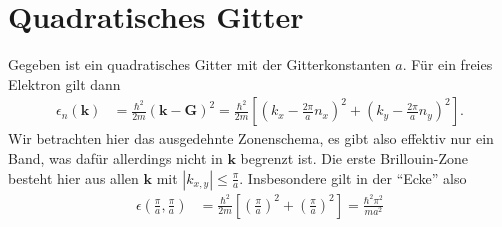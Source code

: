 \documentclass[english, parskip=full]{scrartcl}
\title{\titel}
\author{\autor}
\date{\today}
\newcommand{\kla}{}
\newcommand{\klam}{}
\begin{document}
\maketitle  %

\section{Quadratisches Gitter}
Gegeben ist ein quadratisches Gitter mit der Gitterkonstanten $a$.
Für ein freies Elektron gilt dann
\begin{align}
\epsilon_n(\textbf{k}) &= \frac{\hbar^2}{2m} \kla\left( \textbf{k} - \textbf{G} \right)^2 = \frac{\hbar^2}{2m} \klam\left[ \kla\left( k_x - \frac{2\pi}{a} n_x \right)^2 + \kla\left( k_y - \frac{2\pi}{a}n_y \right)^2 \right].
\end{align}
Wir betrachten hier das ausgedehnte Zonenschema, es gibt also effektiv nur ein Band, was dafür allerdings nicht in $\textbf{k}$ begrenzt ist.
Die erste Brillouin-Zone besteht hier aus allen $\textbf{k}$ mit $|k_{x,y}| \le \frac{\pi}{a}$.
Insbesondere gilt in der ``Ecke'' also
\begin{align}
\epsilon \kla\left( \frac{\pi}{a}, \frac{\pi}{a} \right) &= \frac{\hbar^2}{2m} \klam\left[ \kla\left( \frac{\pi}{a} \right)^2 + \kla\left( \frac{\pi}{a} \right)^2 \right] = \frac{\hbar^2\pi^2}{ma^2}
\end{align}
\end{document}
